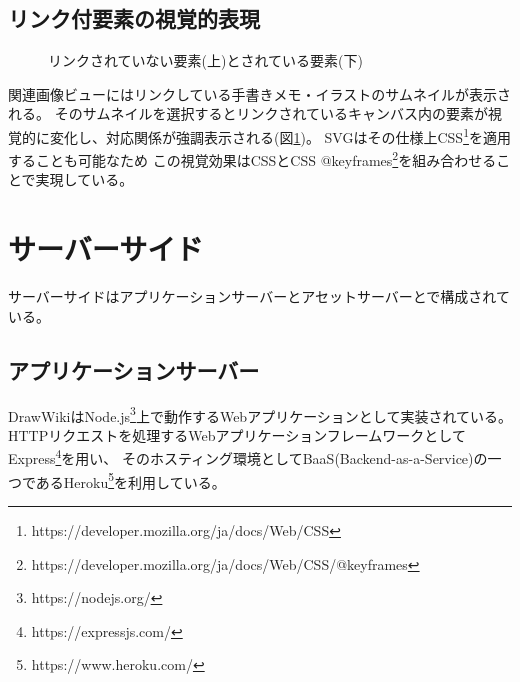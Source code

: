 \subsection{リンク付要素の視覚的表現}

\begin{figure}[htbp]
    \begin{center}
         \end{center}
    \caption{リンクされていない要素(上)とされている要素(下)} \label{linkedelm}
\end{figure}

関連画像ビューにはリンクしている手書きメモ・イラストのサムネイルが表示される。
そのサムネイルを選択するとリンクされているキャンバス内の要素が視覚的に変化し、対応関係が強調表示される(図\ref{linkedelm})。
SVGはその仕様上CSS\footnote{https://developer.mozilla.org/ja/docs/Web/CSS}を適用することも可能なため
この視覚効果はCSSとCSS @keyframes\footnote{https://developer.mozilla.org/ja/docs/Web/CSS/@keyframes}を組み合わせることで実現している。

\section{サーバーサイド}
サーバーサイドはアプリケーションサーバーとアセットサーバーとで構成されている。

\subsection{アプリケーションサーバー}
DrawWikiはNode.js\footnote{https://nodejs.org/}上で動作するWebアプリケーションとして実装されている。
HTTPリクエストを処理するWebアプリケーションフレームワークとしてExpress\footnote{https://expressjs.com/}を用い、
そのホスティング環境としてBaaS(Backend-as-a-Service)の一つであるHeroku\footnote{https://www.heroku.com/}を利用している。

